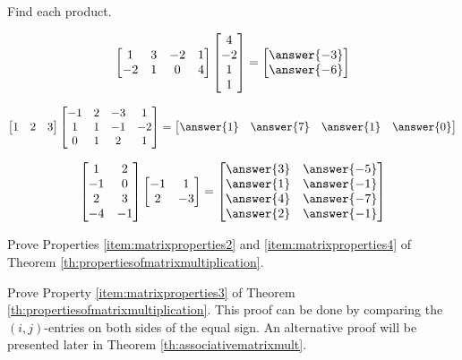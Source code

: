 \documentclass{ximera}
\begin{document}
\begin{problem}
Find each product.
\begin{problem}
$$\begin{bmatrix}1&3&-2&1\\-2&1&0&4\end{bmatrix}\begin{bmatrix}4\\-2\\1\\1\end{bmatrix}=\begin{bmatrix}\answer{-3}\\\answer{-6}\end{bmatrix}$$
\end{problem}
\begin{problem}
$$\begin{bmatrix}1&2&3\end{bmatrix}\begin{bmatrix}-1&2&-3&1\\1&1&-1&-2\\0&1&2&1\end{bmatrix}=\begin{bmatrix}\answer{1}&\answer{7}&\answer{1}&\answer{0}\end{bmatrix}$$
\end{problem}
\begin{problem}
$$\begin{bmatrix}1&2\\-1&0\\2&3\\-4&-1\end{bmatrix}\begin{bmatrix}-1&1\\2&-3\end{bmatrix}=\begin{bmatrix}\answer{3}&\answer{-5}\\\answer{1}&\answer{-1}\\\answer{4}&\answer{-7}\\\answer{2}&\answer{-1}\end{bmatrix}
$$
\end{problem}
\end{problem}

\begin{problem}
Prove Properties \ref{item:matrixproperties2} and \ref{item:matrixproperties4} of Theorem \ref{th:propertiesofmatrixmultiplication}.
\end{problem}

\begin{problem}
Prove Property \ref{item:matrixproperties3} of Theorem \ref{th:propertiesofmatrixmultiplication}.  This proof can be done by comparing the $(i,j)$-entries on both sides of the equal sign.  An alternative proof will be presented later in Theorem \ref{th:associativematrixmult}.
\end{problem}
\end{document}
